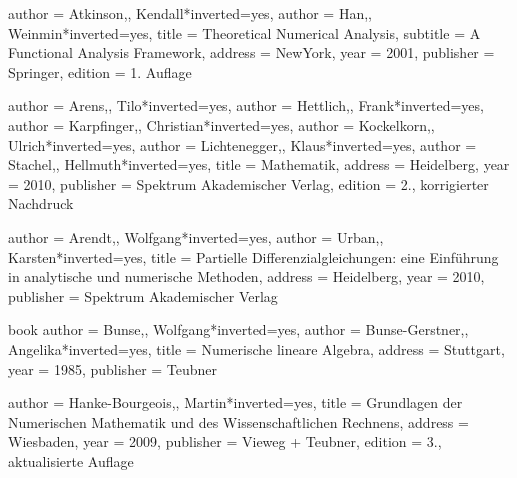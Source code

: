 
\begin{bibdiv}
\begin{biblist}

 {
    author = {{Atkinson,}, Kendall}*{inverted={yes}},
    author = {{Han,}, Weinmin}*{inverted={yes}},
    title = {Theoretical Numerical Analysis},
    subtitle = {A Functional Analysis Framework},
    address = {NewYork},
    year = {2001},
    publisher = {Springer},
    edition = {1. Auflage}
}

 {
    author = {{Arens,}, Tilo}*{inverted={yes}},
    author = {{Hettlich,}, Frank}*{inverted={yes}},
    author = {{Karpfinger,}, Christian}*{inverted={yes}},
    author = {{Kockelkorn,}, Ulrich}*{inverted={yes}},
    author = {{Lichtenegger,}, Klaus}*{inverted={yes}},
    author = {{Stachel,}, Hellmuth}*{inverted={yes}},
    title = {Mathematik},
    address = {Heidelberg},
    year = {2010},
    publisher = {Spektrum Akademischer Verlag},
    edition = {2., korrigierter Nachdruck}
}

 {
    author = {{Arendt,}, Wolfgang}*{inverted={yes}},
    author = {{Urban,}, Karsten}*{inverted={yes}},
    title = {Partielle Differenzialgleichungen: eine Einführung in analytische und numerische Methoden},
    address = {Heidelberg},
    year = {2010},
    publisher = {Spektrum Akademischer Verlag}
}


 {book} {
    author = {{Bunse,}, Wolfgang}*{inverted={yes}},
    author = {{Bunse-Gerstner,}, Angelika}*{inverted={yes}},
    title = {Numerische lineare Algebra},
    address = {Stuttgart},
    year = {1985},
    publisher = {Teubner}
}


 {
    author = {{Hanke-Bourgeois,}, Martin}*{inverted={yes}},
    title = {Grundlagen der Numerischen Mathematik und des Wissenschaftlichen Rechnens},
    address = {Wiesbaden},
    year = {2009},
    publisher = {Vieweg + Teubner},
    edition = {3., aktualisierte Auflage}
}


\end{biblist}
\end{bibdiv}
